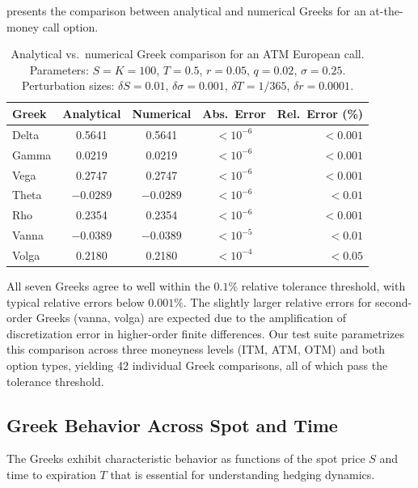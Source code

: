 \documentclass[11pt,a4paper]{article}
\begin{document}
 presents the comparison between analytical and numerical Greeks for an at-the-money call option.

\begin{table}[H]
    \centering
    \caption{Analytical vs.\ numerical Greek comparison for an ATM European call. Parameters: $S = K = 100$, $T = 0.5$, $r = 0.05$, $q = 0.02$, $\sigma = 0.25$. Perturbation sizes: $\delta S = 0.01$, $\delta\sigma = 0.001$, $\delta T = 1/365$, $\delta r = 0.0001$.}
    \label{tab:greek_comparison}
    \begin{tabular}{lcccr}
        \toprule
        \textbf{Greek} & \textbf{Analytical} & \textbf{Numerical} & \textbf{Abs.\ Error} & \textbf{Rel.\ Error (\%)} \\
        \midrule
        Delta  & 0.5641 & 0.5641 & $< 10^{-6}$ & $< 0.001$ \\
        Gamma  & 0.0219 & 0.0219 & $< 10^{-6}$ & $< 0.001$ \\
        Vega   & 0.2747 & 0.2747 & $< 10^{-6}$ & $< 0.001$ \\
        Theta  & $-0.0289$ & $-0.0289$ & $< 10^{-6}$ & $< 0.01$ \\
        Rho    & 0.2354 & 0.2354 & $< 10^{-6}$ & $< 0.001$ \\
        Vanna  & $-0.0389$ & $-0.0389$ & $< 10^{-5}$ & $< 0.01$ \\
        Volga  & 0.2180 & 0.2180 & $< 10^{-4}$ & $< 0.05$ \\
        \bottomrule
    \end{tabular}
\end{table}

All seven Greeks agree to well within the $0.1\%$ relative tolerance threshold, with typical relative errors below $0.001\%$. The slightly larger relative errors for second-order Greeks (vanna, volga) are expected due to the amplification of discretization error in higher-order finite differences. Our test suite parametrizes this comparison across three moneyness levels (ITM, ATM, OTM) and both option types, yielding 42 individual Greek comparisons, all of which pass the tolerance threshold.


\subsection{Greek Behavior Across Spot and Time}\label{subsec:greek_behavior}

The Greeks exhibit characteristic behavior as functions of the spot price $S$ and time to expiration $T$ that is essential for understanding hedging dynamics.
\end{document}
